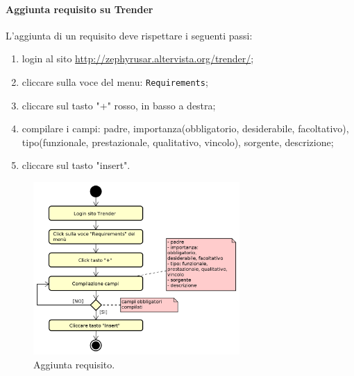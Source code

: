 	    \paragraph{Aggiunta requisito su Trender}
	    L'aggiunta di un requisito deve rispettare i seguenti passi:
	    \begin{enumerate}
			\item login al sito \url{http://zephyrusar.altervista.org/trender/};
			\item cliccare sulla voce del menu: \texttt{Requirements};
			\item cliccare sul tasto "+" rosso, in basso a destra;
			\item compilare i campi: padre, importanza(obbligatorio, desiderabile, facoltativo), tipo(funzionale, prestazionale, qualitativo, vincolo), sorgente, descrizione;
			\item cliccare sul tasto "insert".
		\end{enumerate}
		\begin{figure}[H]
			\centering
			\includegraphics[width=0.7\textwidth]{img/AggiuntaReq}
			\caption{Aggiunta requisito.}
		\end{figure}
			    
